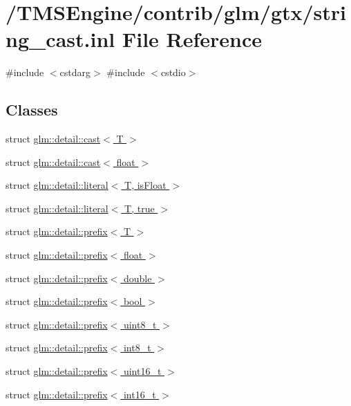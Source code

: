 \hypertarget{string__cast_8inl}{}\section{/\+T\+M\+S\+Engine/contrib/glm/gtx/string\+\_\+cast.inl File Reference}
\label{string__cast_8inl}
{\ttfamily \#include $<$cstdarg$>$}\newline
{\ttfamily \#include $<$cstdio$>$}\newline
\subsection*{Classes}
\begin{DoxyCompactItemize}
\item 
struct \hyperlink{structglm_1_1detail_1_1cast}{glm\+::detail\+::cast$<$ T $>$}
\item 
struct \hyperlink{structglm_1_1detail_1_1cast_3_01float_01_4}{glm\+::detail\+::cast$<$ float $>$}
\item 
struct \hyperlink{structglm_1_1detail_1_1literal}{glm\+::detail\+::literal$<$ T, is\+Float $>$}
\item 
struct \hyperlink{structglm_1_1detail_1_1literal_3_01_t_00_01true_01_4}{glm\+::detail\+::literal$<$ T, true $>$}
\item 
struct \hyperlink{structglm_1_1detail_1_1prefix}{glm\+::detail\+::prefix$<$ T $>$}
\item 
struct \hyperlink{structglm_1_1detail_1_1prefix_3_01float_01_4}{glm\+::detail\+::prefix$<$ float $>$}
\item 
struct \hyperlink{structglm_1_1detail_1_1prefix_3_01double_01_4}{glm\+::detail\+::prefix$<$ double $>$}
\item 
struct \hyperlink{structglm_1_1detail_1_1prefix_3_01bool_01_4}{glm\+::detail\+::prefix$<$ bool $>$}
\item 
struct \hyperlink{structglm_1_1detail_1_1prefix_3_01uint8__t_01_4}{glm\+::detail\+::prefix$<$ uint8\+\_\+t $>$}
\item 
struct \hyperlink{structglm_1_1detail_1_1prefix_3_01int8__t_01_4}{glm\+::detail\+::prefix$<$ int8\+\_\+t $>$}
\item 
struct \hyperlink{structglm_1_1detail_1_1prefix_3_01uint16__t_01_4}{glm\+::detail\+::prefix$<$ uint16\+\_\+t $>$}
\item 
struct \hyperlink{structglm_1_1detail_1_1prefix_3_01int16__t_01_4}{glm\+::detail\+::prefix$<$ int16\+\_\+t $>$}

\end{DoxyCompactItemize}
